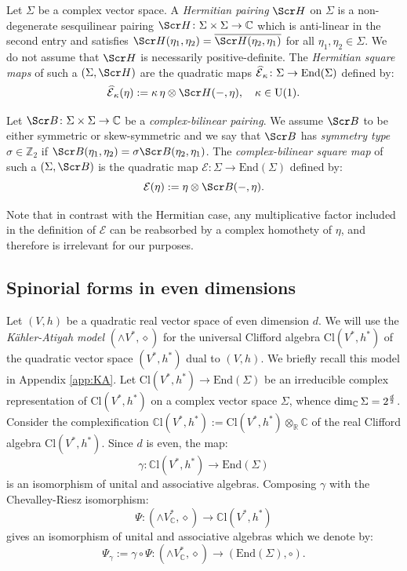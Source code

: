 \documentclass[10pt,a4paper,twoside,reqno]{amsart}
\theoremstyle{plain}
\theoremstyle{definition}
\theoremstyle{remark}
\newcommand{\End}{\mathrm{End}}
\def\Z{\mathbb{Z}}
\def\C{\mathbb{C}}
\def\R{\mathbb{R}}
\def\scB{\Scr B}
\def\scS{\Scr H}
\def\U{\mathrm{U}}
\def\cE{\mathcal{E}}
\def\hcE{\smash{\widehat{\mathcal{E}}}}
\def\R{\mathbb{R}}
\def\mCl{\mathbb{C}\mathrm{l}}
\begin{document}
Let $\Sigma$ be a complex vector space. A \emph{Hermitian pairing} $\scS$ on $\Sigma$ is a non-degenerate sesquilinear pairing $\scS\colon\Sigma\times\Sigma\to\C$ which is anti-linear in the second entry and satisfies $\scS(\eta_1,\eta_2)=\overline{\scS(\eta_2,\eta_1)}$ for all $\eta_1,\eta_2\in\Sigma$. We do not assume that $\scS$ is necessarily positive-definite. The \emph{Hermitian square maps} of such a $(\Sigma,\scS)$ are the quadratic maps $\hcE_\kappa\colon\Sigma\to\End(\Sigma)$ defined by: $$\hcE_\kappa(\eta):=\kappa\,\eta\otimes\scS(-,\eta),\quad \kappa\in\U(1).$$

Let $\scB\colon\Sigma\times\Sigma\to\C$ be a \emph{complex-bilinear pairing}. We assume $\scB$ to be either symmetric or skew-symmetric and we say that $\scB$ has \emph{symmetry type} $\sigma\in\Z_2$ if $\scB(\eta_1,\eta_2)=\sigma\scB(\eta_2,\eta_1)$. The \emph{complex-bilinear square map} of such a $(\Sigma,\scB)$ is the quadratic map $\cE\colon\Sigma\to\End(\Sigma)$ defined by: $$\cE(\eta):=\eta\otimes\scB(-,\eta).$$

Note that in contrast with the Hermitian case, any multiplicative factor included in the definition of $\cE$ can be reabsorbed by a complex homothety of $\eta$, and therefore is irrelevant for our purposes.


\subsection{Spinorial forms in even dimensions}


Let $(V,h)$ be a quadratic real vector space of even dimension $d$. We will use the \emph{Kähler-Atiyah model} $(\wedge V^*,\diamond)$ for the universal Clifford algebra $\mathrm{Cl}(V^*,h^*)$ of the quadratic vector space $(V^*,h^*)$ dual to $(V,h)$. We briefly recall this model in Appendix \ref{app:KA}. Let $\mathrm{Cl}(V^*,h^*)\to\End(\Sigma)$ be an irreducible complex representation of $\mathrm{Cl}(V^*,h^*)$ on a complex vector space $\Sigma$, whence $\dim_\C\Sigma=2^{\smash{\frac{d}{2}}}$. Consider the complexification $\mCl(V^*,h^*):=\mathrm{Cl}(V^*,h^*)\otimes_\R\C$ of the real Clifford algebra $\mathrm{Cl}(V^*,h^*)$. Since $d$ is even, the map: $$\gamma\colon\mCl(V^*,h^*)\to\End(\Sigma)$$ is an isomorphism of unital and associative algebras. Composing $\gamma$ with the Chevalley-Riesz isomorphism: $$\Psi\colon(\wedge V^*_\C,\diamond)\to\mCl(V^*,h^*)$$ gives an isomorphism of unital and associative algebras which we denote by: \begin{equation}\label{eq:Psi_gamma}
    \Psi_\gamma:=\gamma\circ\Psi\colon(\wedge V^*_\C,\diamond)\to(\End(\Sigma),\circ).
\end{equation}
\end{document}
